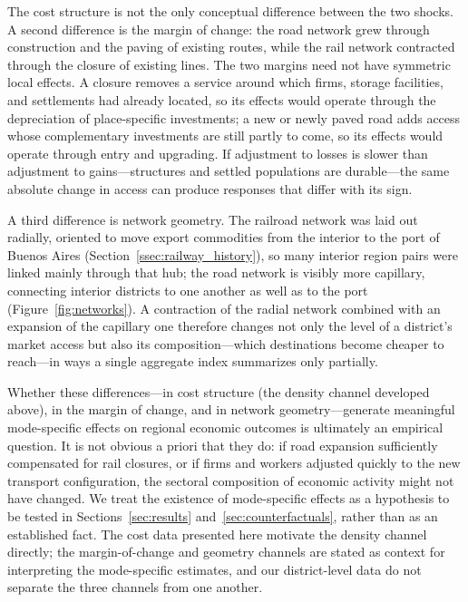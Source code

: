 
The cost structure is not the only conceptual difference between
the two shocks. A second difference is the margin of change: the
road network grew through construction and the paving of existing
routes, while the rail network contracted through the closure of
existing lines. The two margins need not have symmetric local
effects. A closure removes a service around which firms, storage
facilities, and settlements had already located, so its effects
would operate through the depreciation of place-specific
investments; a new or newly paved road adds access whose
complementary investments are still partly to come, so its effects
would operate through entry and upgrading. If adjustment to losses
is slower than adjustment to gains—structures and settled
populations are durable—the same absolute change in access can
produce responses that differ with its sign.

A third difference is network geometry. The railroad network was
laid out radially, oriented to move export commodities from the
interior to the port of Buenos Aires
(Section~\ref{ssec:railway_history}), so many interior region pairs
were linked mainly through that hub; the road network is visibly
more capillary, connecting interior districts to one another as
well as to the port (Figure~\ref{fig:networks}). A contraction of
the radial network combined with an expansion of the capillary one
therefore changes not only the level of a district's market access
but also its composition—which destinations become cheaper to
reach—in ways a single aggregate index summarizes only partially.

Whether these differences—in cost structure (the density channel
developed above), in the margin of change, and in network
geometry—generate meaningful
mode-specific effects on regional economic outcomes is ultimately
an empirical question. It is not obvious a priori that they do: if
road expansion sufficiently compensated for rail closures, or if
firms and workers adjusted quickly to the new transport
configuration, the sectoral composition of economic activity might
not have changed. We treat the existence of mode-specific effects
as a hypothesis to be tested in
Sections~\ref{sec:results} and~\ref{sec:counterfactuals},
rather than as an established fact. The cost data presented here
motivate the density channel directly; the margin-of-change and
geometry channels are stated as context for interpreting the
mode-specific estimates, and our district-level data do not separate
the three channels from one another.
